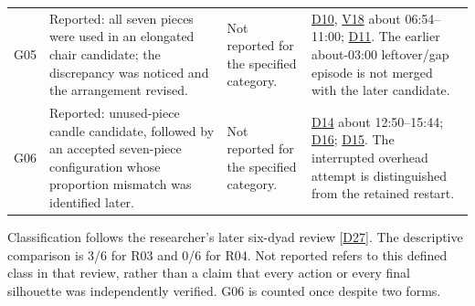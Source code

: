 \begin{longtable}{@{}>{\raggedright\arraybackslash}p{12.623mm}>{\raggedright\arraybackslash}p{45.637mm}>{\raggedright\arraybackslash}p{38.840mm}>{\raggedright\arraybackslash}p{58.260mm}@{}}
\addlinespace[3pt]
G05 & Reported: all seven pieces were used in an elongated chair candidate; the discrepancy was noticed and the arrangement revised. & Not reported for the specified category. & \hyperlink{src:D10}{D10}, \href{https://github.com/YiyangQin-UQ/REIT7841/blob/main/thesis/v1.1/materials/README.md\#d10}{V18} about 06:54--11:00; \hyperlink{src:D11}{D11}. The earlier about-03:00 leftover/gap episode is not merged with the later candidate. \\
\addlinespace[3pt]
G06 & Reported: unused-piece candle candidate, followed by an accepted seven-piece configuration whose proportion mismatch was identified later. & Not reported for the specified category. & \hyperlink{src:D14}{D14} about 12:50--15:44; \hyperlink{src:D16}{D16}; \hyperlink{src:D15}{D15}. The interrupted overhead attempt is distinguished from the retained restart. \\
\end{longtable}
\endgroup

Classification follows the researcher's later six-dyad review [\hyperlink{src:D27}{D27}]. The descriptive comparison is 3/6 for R03 and 0/6 for R04. Not reported refers to this defined class in that review, rather than a claim that every action or every final silhouette was independently verified. G06 is counted once despite two forms.

